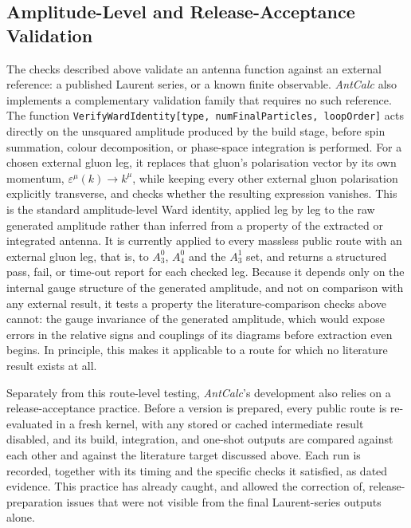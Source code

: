 \subsection{Amplitude-Level and Release-Acceptance Validation}\label{subsec:wardAndRelease}

The checks described above validate an antenna function against an external reference: a
published Laurent series, or a known finite observable. \textit{AntCalc} also implements a
complementary validation family that requires no such reference. The function
\texttt{VerifyWardIdentity[type, numFinalParticles, loopOrder]} acts directly on the unsquared
amplitude produced by the build stage, before spin summation, colour decomposition, or
phase-space integration is performed. For a chosen external gluon leg, it replaces that gluon's
polarisation vector by its own momentum, $\varepsilon^\mu(k)\to k^\mu$, while keeping every other
external gluon polarisation explicitly transverse, and checks whether the resulting expression
vanishes. This is the standard amplitude-level Ward identity, applied leg by leg to the raw
generated amplitude rather than inferred from a property of the extracted or integrated antenna.
It is currently applied to every massless public route with an external gluon leg, that is, to $A_3^0$,
$A_4^0$ and the $A_3^1$ set, and returns a structured pass, fail, or time-out report for each
checked leg. Because it depends only on the internal gauge structure of the generated amplitude,
and not on comparison with any external result, it tests a property the literature-comparison
checks above cannot: the gauge invariance of the generated amplitude, which would expose errors in the relative signs
and couplings of its diagrams before extraction even begins. In principle, this makes it applicable to a route for
which no literature result exists at all.

Separately from this route-level testing, \textit{AntCalc}'s development also relies on a
release-acceptance practice. Before a version is prepared, every public route is re-evaluated in a
fresh kernel, with any stored or cached intermediate result disabled, and its build, integration,
and one-shot outputs are compared against each other and against the literature target discussed
above. Each run is recorded, together with its timing and the specific checks it satisfied, as
dated evidence. This practice has already caught, and allowed the correction of, release-preparation
issues that were not visible from the final Laurent-series outputs alone.

